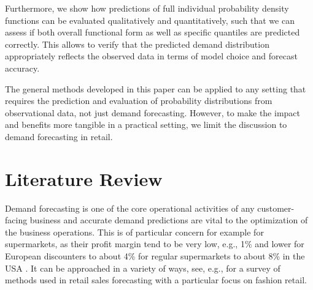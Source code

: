 \documentclass[BCOR=1mm, DIV=calc,10pt,
twoside=true,
twocolumn,
headings=normal]{scrartcl}
\begin{document}
Furthermore, we show how predictions of full individual probability density functions can be evaluated qualitatively and quantitatively, such that we can assess if both overall functional form as well as specific quantiles are predicted correctly. This allows to verify that the predicted demand distribution appropriately reflects the observed data in terms of model choice and forecast accuracy.

The general methods developed in this paper can be applied to any setting that requires the prediction and evaluation of probability distributions from observational data, not just demand forecasting. However, to make the impact and benefits more tangible in a practical setting, we limit the discussion to demand forecasting in retail.


\section{Literature Review}
\label{sec:LitRev}

Demand forecasting is one of the core operational activities of any customer-facing business and accurate demand predictions are vital to the optimization of the business operations. This is of particular concern for example for supermarkets, as their profit margin tend to be very low, e.g., 1\% and lower for European discounters \cite{MarginLidlSweden} to about 4\% for regular supermarkets \cite{MarginWillysSweden,MarginHemkopSweden} to about 8\% in the USA \cite{MarginPublixUSA}. It can be approached in a variety of ways, see, e.g., \cite{beheshti2015survey} for a survey of methods used in retail sales forecasting with a particular focus on fashion retail.
\end{document}
